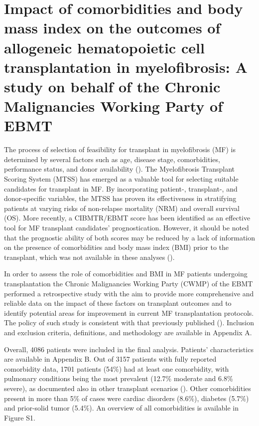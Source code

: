 \documentclass[
  letterpaper,
  DIV=11,
  numbers=noendperiod]{scrreprt}
\begin{document}

\chapter{Impact of comorbidities and body mass index on the outcomes of
allogeneic hematopoietic cell transplantation in myelofibrosis: A study
on behalf of the Chronic Malignancies Working Party of
EBMT}\label{sec-chap-polverelli}

The process of selection of feasibility for transplant in myelofibrosis
(MF) is determined by several factors such as age, disease stage,
comorbidities, performance status, and donor availability
(). The Myelofibrosis Transplant Scoring System
(MTSS) has emerged as a valuable tool for selecting suitable candidates
for transplant in MF. By incorporating patient-, transplant-, and
donor-specific variables, the MTSS has proven its effectiveness in
stratifying patients at varying risks of non-relapse mortality (NRM) and
overall survival (OS). More recently, a CIBMTR/EBMT score has been
identified as an effective tool for MF transplant candidates'
prognostication. However, it should be noted that the prognostic ability
of both scores may be reduced by a lack of information on the presence
of comorbidities and body mass index (BMI) prior to the transplant,
which was not available in these analyses
().

In order to assess the role of comorbidities and BMI in MF patients
undergoing transplantation the Chronic Malignancies Working Party (CWMP)
of the EBMT performed a retrospective study with the aim to provide more
comprehensive and reliable data on the impact of these factors on
transplant outcomes and to identify potential areas for improvement in
current MF transplantation protocols. The policy of such study is
consistent with that previously published
(). Inclusion and exclusion criteria, definitions, and
methodology are available in Appendix A.

Overall, 4086 patients were included in the final analysis. Patients'
characteristics are available in Appendix B. Out of 3157 patients with
fully reported comorbidity data, 1701 patients (54\%) had at least one
comorbidity, with pulmonary conditions being the most prevalent (12.7\%
moderate and 6.8\% severe), as documented also in other transplant
scenarios
(). Other comorbidities present in more than 5\% of
cases were cardiac disorders (8.6\%), diabetes (5.7\%) and prior-solid
tumor (5.4\%). An overview of all comorbidities is available in Figure
S1.
\end{document}
